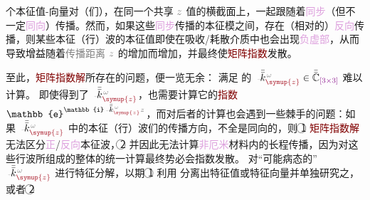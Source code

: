 个\textcolor{PineGreen}{本征值}-\textcolor{PineGreen}{向量}对（们），在同一个共享 $\mathcolor{gray}{z}$ 值的横截面上，一起跟随着\textcolor{Plum}{同步}（但不一定\textcolor{Plum}{同向}）传播。然而，如果这些\textcolor{Plum}{同步}传播的\textcolor{PineGreen}{本征模}之间，存在（相对的）\textcolor{Plum}{反向}传播，则某些\textcolor{PineGreen}{本征（行）波}的\textcolor{PineGreen}{本征值}即使在\textcolor{NavyBlue}{吸收}/\textcolor{NavyBlue}{耗散}介质中也会出现\textcolor{Plum}{负虚部}，从而导致增益随着\textcolor{gray}{传播距离} $\mathcolor{gray}{z}$ 的增加而增加，并最终使\textcolor{Maroon}{矩阵指数}发散。

至此，\textcolor{Maroon}{矩阵指数解}所存在的问题，便一览无余：{\one} 满足  的 $\xint{\begin{smallmatrix} ~ \\ {}^{}_{\mathcolor{gray}{-}} \\ ~ \end{smallmatrix}}{15}{\bar{\bar{k}}}_{\textcolor{Maroon}{\symup{z}}}^{\;\! \mathcolor{gray}{\omega}} \in \bar{\bar{\mathbb{C}}}_{\textcolor{Plum}{\left[3 \times 3\right]}}$ 难以计算\cite{sturmElectromagneticWavesCrystals2024}。{\two} 即使得到了 $\xint{\begin{smallmatrix} ~ \\ {}^{}_{\mathcolor{gray}{-}} \\ ~ \end{smallmatrix}}{15}{\bar{\bar{k}}}_{\textcolor{Maroon}{\symup{z}}}^{\;\! \mathcolor{gray}{\omega}}$，也需要计算它的\textcolor{Maroon}{指数} $\mathbb{e}^{\mathbb{i} \xint{\begin{smallmatrix} ~ \\ {}^{}_{\mathcolor{gray}{-}} \\ ~ \end{smallmatrix}}{15}{\bar{\bar{k}}}_{\textcolor{Maroon}{\symup{z}}}^{\;\! \mathcolor{gray}{\omega}} \mathcolor{gray}{z}}$，而对后者的计算也会遇到一些棘手的问题：如果 $\xint{\begin{smallmatrix} ~ \\ {}^{}_{\mathcolor{gray}{-}} \\ ~ \end{smallmatrix}}{15}{\bar{\bar{k}}}_{\textcolor{Maroon}{\symup{z}}}^{\;\! \mathcolor{gray}{\omega}}$ 中的\textcolor{PineGreen}{本征（行）波}们的传播方向，不全是同向的，则 \textcircled{1} \textcolor{Maroon}{矩阵指数解}无法区分\textcolor{Plum}{正}/\textcolor{Plum}{反向}\textcolor{PineGreen}{本征波}，\textcircled{2} 并因此无法计算\textcolor{Plum}{非厄米}材料内的长程传播，因为对这些行波所组成的整体的统一计算最终势必会指数发散\cite{stallingaBerreman4x4Matrix1999}。{\three} 对“可能病态的” $\xint{\begin{smallmatrix} ~ \\ {}^{}_{\mathcolor{gray}{-}} \\ ~ \end{smallmatrix}}{15}{\bar{\bar{k}}}_{\textcolor{Maroon}{\symup{z}}}^{\;\! \mathcolor{gray}{\omega}}$ 进行特征分解，以期 \textcircled{1} 利用  分离出\textcolor{PineGreen}{特征值}或\textcolor{PineGreen}{特征向量}并单独研究之，或者 \textcircled{2} 